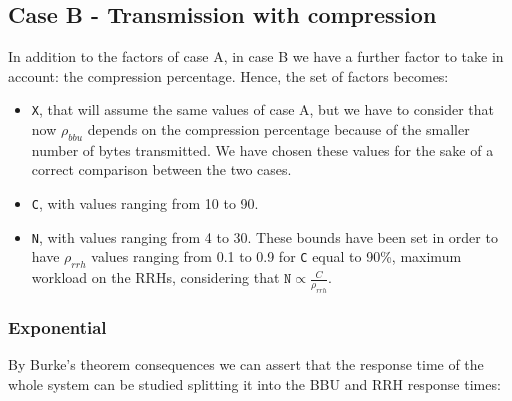 \documentclass[11pt,a4paper,oneside, openright]{article}
\begin{document}
\subsection{Case B - Transmission with compression}
In addition to the factors of case A, in case B we have a further factor to take in account: the compression percentage. Hence, the set of factors becomes:

\begin{itemize}
	\item \texttt{X}, that will assume the same values of case A, but we have to consider that now $ \rho_{bbu} $ depends on the compression percentage because of the smaller number of bytes transmitted. We have chosen these values for the sake of a correct comparison between the two cases.
	\item \texttt{C}, with values ranging from 10 to 90. 
	\item \texttt{N}, with values ranging from 4 to 30. These bounds have been set in order to have $\rho_{rrh}$ values ranging from 0.1 to 0.9 for \texttt{C} equal to 90\%, maximum workload on the RRHs, considering that $\texttt{N} \propto \frac{C}{\rho_{rrh}}$.	
\end{itemize}


\subsubsection{Exponential}
By Burke's theorem consequences we can assert that the response time of the whole system can be studied splitting it into the BBU and RRH response times:
\end{document}

